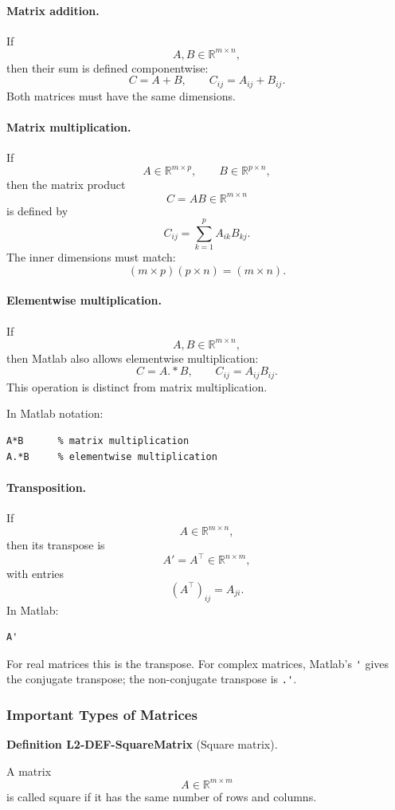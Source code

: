 \documentclass[10pt, letterpaper]{article}
\newcommand{\R}{\mathbb{R}}
\newcommand{\CustomHeading}[3]{%
  \par\medskip\noindent%
  \textbf{#1 #2} \textnormal{(#3)}.\enskip%
}
\newenvironment{DEF}[2]{\CustomHeading{Definition}{#1}{#2}}{}
\begin{document}
\paragraph{Matrix addition.}
If
\[
A,B\in\R^{m\times n},
\]
then their sum is defined componentwise:
\[
C=A+B,
\qquad
C_{ij}=A_{ij}+B_{ij}.
\]
Both matrices must have the same dimensions.

\paragraph{Matrix multiplication.}
If
\[
A\in\R^{m\times p},
\qquad
B\in\R^{p\times n},
\]
then the matrix product
\[
C=AB\in\R^{m\times n}
\]
is defined by
\[
C_{ij}=\sum_{k=1}^p A_{ik}B_{kj}.
\]
The inner dimensions must match:
\[
(m\times p)(p\times n)=(m\times n).
\]

\paragraph{Elementwise multiplication.}
If
\[
A,B\in\R^{m\times n},
\]
then Matlab also allows elementwise multiplication:
\[
C=A.*B,
\qquad
C_{ij}=A_{ij}B_{ij}.
\]
This operation is distinct from matrix multiplication.

In Matlab notation:
\begin{verbatim}
A*B      % matrix multiplication
A.*B     % elementwise multiplication
\end{verbatim}

\paragraph{Transposition.}
If
\[
A\in\R^{m\times n},
\]
then its transpose is
\[
A'=A^\top\in\R^{n\times m},
\]
with entries
\[
(A^\top)_{ij}=A_{ji}.
\]
In Matlab:
\begin{verbatim}
A'
\end{verbatim}

For real matrices this is the transpose. For complex matrices, Matlab's \verb|'| gives the conjugate transpose; the non-conjugate transpose is \verb|.'|.

\subsubsection{Important Types of Matrices}

\begin{DEF}{L2-DEF-SquareMatrix}{Square matrix}
A matrix
\[
A\in\R^{m\times m}
\]
is called square if it has the same number of rows and columns.
\end{DEF}
\end{document}
